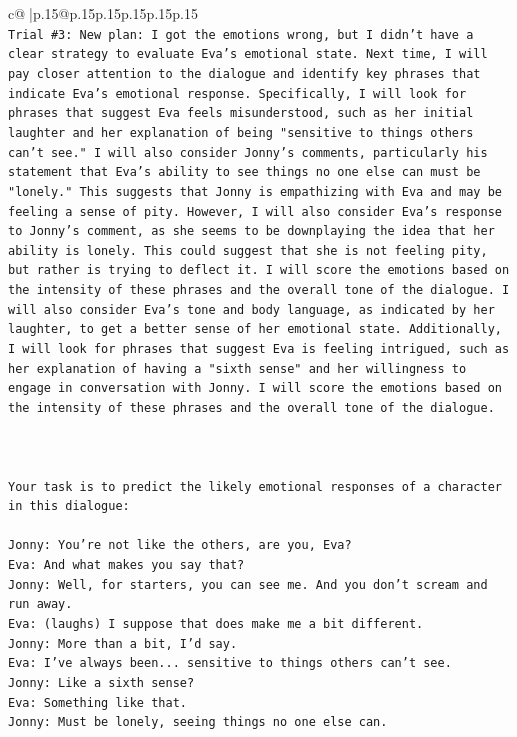 \documentclass{article}
\begin{document}
{\begin{supertabular}{c@{$\;$}|p{.15\linewidth}@{}p{.15\linewidth}p{.15\linewidth}p{.15\linewidth}p{.15\linewidth}p{.15\linewidth}}
{{{\\ 
\texttt{Trial \#3: New plan: I got the emotions wrong, but I didn't have a clear strategy to evaluate Eva's emotional state. Next time, I will pay closer attention to the dialogue and identify key phrases that indicate Eva's emotional response. Specifically, I will look for phrases that suggest Eva feels misunderstood, such as her initial laughter and her explanation of being "sensitive to things others can't see." I will also consider Jonny's comments, particularly his statement that Eva's ability to see things no one else can must be "lonely." This suggests that Jonny is empathizing with Eva and may be feeling a sense of pity. However, I will also consider Eva's response to Jonny's comment, as she seems to be downplaying the idea that her ability is lonely. This could suggest that she is not feeling pity, but rather is trying to deflect it. I will score the emotions based on the intensity of these phrases and the overall tone of the dialogue. I will also consider Eva's tone and body language, as indicated by her laughter, to get a better sense of her emotional state. Additionally, I will look for phrases that suggest Eva is feeling intrigued, such as her explanation of having a "sixth sense" and her willingness to engage in conversation with Jonny. I will score the emotions based on the intensity of these phrases and the overall tone of the dialogue.} \\
\\ 
\\ 
\\ 
\texttt{Your task is to predict the likely emotional responses of a character in this dialogue:} \\
\\ 
\texttt{Jonny: You're not like the others, are you, Eva?} \\
\texttt{Eva: And what makes you say that?} \\
\texttt{Jonny: Well, for starters, you can see me. And you don't scream and run away.} \\
\texttt{Eva: (laughs) I suppose that does make me a bit different.} \\
\texttt{Jonny: More than a bit, I'd say. } \\
\texttt{Eva: I've always been... sensitive to things others can't see. } \\
\texttt{Jonny: Like a sixth sense?} \\
\texttt{Eva: Something like that. } \\
\texttt{Jonny: Must be lonely, seeing things no one else can.} \\
}}}
\end{supertabular}}
\end{document}
